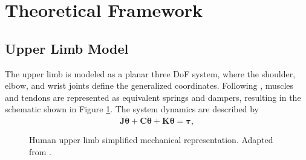 \section{Theoretical Framework}
\label{sec:theory}

    \subsection{Upper Limb Model}
    
    The upper limb is modeled as a planar three DoF system, where the shoulder, elbow, and wrist joints define the generalized coordinates. Following \cite{Gebai:2018}, muscles and tendons are represented as equivalent springs and dampers, resulting in the schematic shown in Figure \ref{fig:system}. The system dynamics are described by
    \begin{equation}
        \mathbf{J}\ddot{\bm{\theta}} +
        \mathbf{C}\dot{\bm{\theta}} +
        \mathbf{K}\bm{\theta}
        =
        \bm{\tau},
    \label{eq:system}
    \end{equation}
    
    \begin{figure}[htbp]
        \centering
        \caption{
            Human upper limb simplified mechanical representation. 
            Adapted from \cite{Albuquerque:2025}.
        }
        \label{fig:system}
        
    \end{figure}
    
